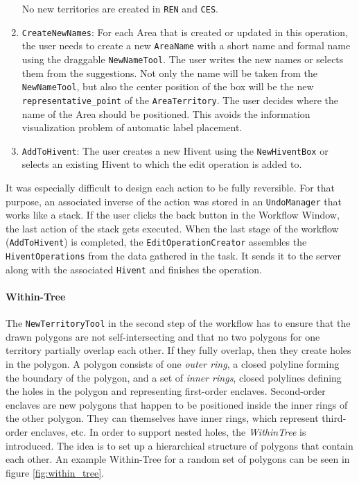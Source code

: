 \begin{enumerate}
\begin{itemize}
  \end{itemize}
  No new territories are created in \texttt{REN} and \texttt{CES}.

  \item \texttt{CreateNewNames}: For each Area that is created or updated in this operation, the user needs to create a new \texttt{AreaName} with a short name and formal name using the draggable \texttt{NewNameTool}. The user writes the new names or selects them from the suggestions. Not only the name will be taken from the \texttt{NewNameTool}, but also the center position of the box will be the new \texttt{representative\_point} of the \texttt{AreaTerritory}. The user decides where the name of the Area should be positioned. This avoids the information visualization problem of automatic label placement.

  \item \texttt{AddToHivent}: The user creates a new Hivent using the \texttt{NewHiventBox} or selects an existing Hivent to which the edit operation is added to.

\end{enumerate}

It was especially difficult to design each action to be fully reversible. For that purpose, an associated inverse of the action was stored in an \texttt{UndoManager} that works like a stack. If the user clicks the back button in the Workflow Window, the last action of the stack gets executed. When the last stage of the workflow (\texttt{AddToHivent}) is completed, the \texttt{EditOperationCreator} assembles the \texttt{HiventOperations} from the data gathered in the task. It sends it to the server along with the associated \texttt{Hivent} and finishes the operation.



\paragraph{Within-Tree} %
\label{par:within_tree}

The \texttt{NewTerritoryTool} in the second step of the workflow has to ensure that the drawn polygons are not self-intersecting and that no two polygons for one territory partially overlap each other. If they fully overlap, then they create holes in the polygon. A polygon consists of one \emph{outer ring}, a closed polyline forming the boundary of the polygon, and a set of \emph{inner rings}, closed polylines defining the holes in the polygon and representing first-order enclaves. Second-order enclaves are new polygons that happen to be positioned inside the inner rings of the other polygon. They can themselves have inner rings, which represent third-order enclaves, etc. In order to support nested holes, the \emph{WithinTree} is introduced. The idea is to set up a hierarchical structure of polygons that contain each other. An example Within-Tree for a random set of polygons can be seen in figure \ref{fig:within_tree}.

